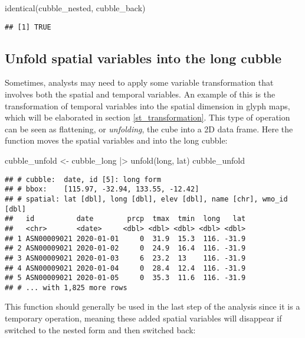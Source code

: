 \documentclass{article}
\newenvironment{Shaded}{\begin{snugshade}}{\end{snugshade}}
\newcommand{\FunctionTok}[1]{\textcolor[rgb]{0.00,0.00,0.00}{#1}}
\newcommand{\NormalTok}[1]{#1}
\newcommand{\OtherTok}[1]{\textcolor[rgb]{0.56,0.35,0.01}{#1}}
\newcommand{\SpecialCharTok}[1]{\textcolor[rgb]{0.00,0.00,0.00}{#1}}
\begin{document}
\begin{Shaded}
\begin{Highlighting}[]
\FunctionTok{identical}\NormalTok{(cubble\_nested, cubble\_back)}
\end{Highlighting}
\end{Shaded}

\begin{verbatim}
## [1] TRUE
\end{verbatim}

\hypertarget{unfold}{%
\subsection{Unfold spatial variables into the long cubble}\label{unfold}}

Sometimes, analysts may need to apply some variable transformation that involves both the spatial and temporal variables. An example of this is the transformation of temporal variables into the spatial dimension in glyph maps, which will be elaborated in section \ref{st_transformation}. This type of operation can be seen as flattening, or \emph{unfolding}, the cube into a 2D data frame. Here the function  moves the spatial variables  and  into the long cubble:

\begin{Shaded}
\begin{Highlighting}[]
\NormalTok{cubble\_unfold }\OtherTok{\textless{}{-}}\NormalTok{ cubble\_long }\SpecialCharTok{|\textgreater{}} \FunctionTok{unfold}\NormalTok{(long, lat)}
\NormalTok{cubble\_unfold}
\end{Highlighting}
\end{Shaded}

\begin{verbatim}
## # cubble:  date, id [5]: long form
## # bbox:    [115.97, -32.94, 133.55, -12.42]
## # spatial: lat [dbl], long [dbl], elev [dbl], name [chr], wmo_id [dbl]
##   id          date        prcp  tmax  tmin  long   lat
##   <chr>       <date>     <dbl> <dbl> <dbl> <dbl> <dbl>
## 1 ASN00009021 2020-01-01     0  31.9  15.3  116. -31.9
## 2 ASN00009021 2020-01-02     0  24.9  16.4  116. -31.9
## 3 ASN00009021 2020-01-03     6  23.2  13    116. -31.9
## 4 ASN00009021 2020-01-04     0  28.4  12.4  116. -31.9
## 5 ASN00009021 2020-01-05     0  35.3  11.6  116. -31.9
## # ... with 1,825 more rows
\end{verbatim}

This function should generally be used in the last step of the analysis since it is a temporary operation, meaning these added spatial variables will disappear if switched to the nested form and then switched back:
\end{document}
